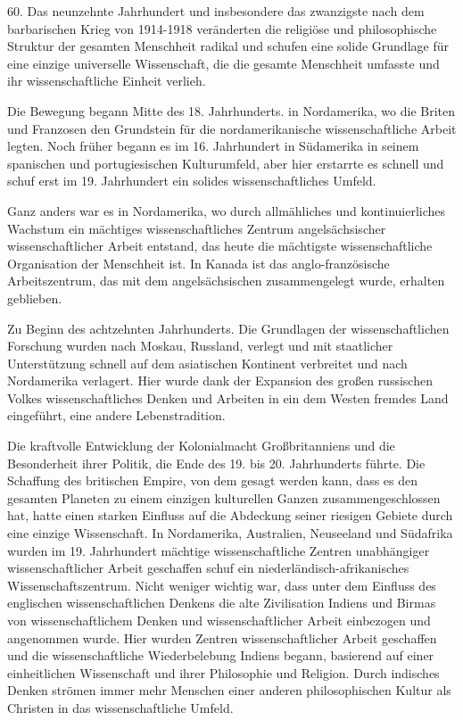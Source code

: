 \documentclass[11pt,a4paper]{book}
\begin{document}
60. Das neunzehnte Jahrhundert und insbesondere das zwanzigste nach dem barbarischen Krieg von 1914-1918 veränderten die religiöse und philosophische Struktur der gesamten Menschheit radikal und schufen eine solide Grundlage für eine einzige universelle Wissenschaft, die die gesamte Menschheit umfasste und ihr wissenschaftliche Einheit verlieh.



Die Bewegung begann Mitte des 18. Jahrhunderts. in Nordamerika, wo die Briten und Franzosen den Grundstein für die nordamerikanische wissenschaftliche Arbeit legten. Noch früher begann es im 16. Jahrhundert in Südamerika in seinem spanischen und portugiesischen Kulturumfeld, aber hier erstarrte es schnell und schuf erst im 19. Jahrhundert ein solides wissenschaftliches Umfeld.



Ganz anders war es in Nordamerika, wo durch allmähliches und kontinuierliches Wachstum ein mächtiges wissenschaftliches Zentrum angelsächsischer wissenschaftlicher Arbeit entstand, das heute die mächtigste wissenschaftliche Organisation der Menschheit ist. In Kanada ist das anglo-französische Arbeitszentrum, das mit dem angelsächsischen zusammengelegt wurde, erhalten geblieben.



Zu Beginn des achtzehnten Jahrhunderts. Die Grundlagen der wissenschaftlichen Forschung wurden nach Moskau, Russland, verlegt und mit staatlicher Unterstützung schnell auf dem asiatischen Kontinent verbreitet und nach Nordamerika verlagert. Hier wurde dank der Expansion des großen russischen Volkes wissenschaftliches Denken und Arbeiten in ein dem Westen fremdes Land eingeführt, eine andere Lebenstradition.



Die kraftvolle Entwicklung der Kolonialmacht Großbritanniens und die Besonderheit ihrer Politik, die Ende des 19. bis 20. Jahrhunderts führte. Die Schaffung des britischen Empire, von dem gesagt werden kann, dass es den gesamten Planeten zu einem einzigen kulturellen Ganzen zusammengeschlossen hat, hatte einen starken Einfluss auf die Abdeckung seiner riesigen Gebiete durch eine einzige Wissenschaft. In Nordamerika, Australien, Neuseeland und Südafrika wurden im 19. Jahrhundert mächtige wissenschaftliche Zentren unabhängiger wissenschaftlicher Arbeit geschaffen schuf ein niederländisch-afrikanisches Wissenschaftszentrum. Nicht weniger wichtig war, dass unter dem Einfluss des englischen wissenschaftlichen Denkens die alte Zivilisation Indiens und Birmas von wissenschaftlichem Denken und wissenschaftlicher Arbeit einbezogen und angenommen wurde. Hier wurden Zentren wissenschaftlicher Arbeit geschaffen und die wissenschaftliche Wiederbelebung Indiens begann, basierend auf einer einheitlichen Wissenschaft und ihrer Philosophie und Religion. Durch indisches Denken strömen immer mehr Menschen einer anderen philosophischen Kultur als Christen in das wissenschaftliche Umfeld.
\end{document}
